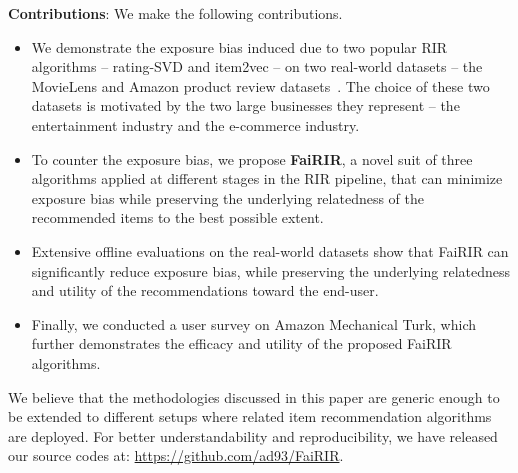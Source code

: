 \vspace{1mm}
\noindent
\textbf{Contributions}: We make the following contributions. 
\begin{itemize}[noitemsep,topsep=0pt,parsep=0pt,partopsep=0pt,leftmargin=*]
	\item We demonstrate the exposure bias induced due to two popular RIR algorithms -- rating-SVD and item2vec -- on two real-world datasets -- the MovieLens and Amazon product review datasets~\cite{harper2016movielens,he2016ups}. The choice of these two datasets is motivated by the two large businesses they represent -- the entertainment industry and the e-commerce industry.
	\item To counter the exposure bias, we propose {\bf FaiRIR}, a novel suit of three algorithms %
	applied at different stages in the RIR pipeline, that can minimize exposure bias
	while preserving the underlying relatedness of the recommended items to the best possible extent.
	\item Extensive offline evaluations on the real-world datasets show that %
	FaiRIR can significantly reduce exposure bias, while preserving the underlying relatedness and utility of the recommendations toward the end-user.
	\item Finally, we conducted %
	a user survey on Amazon Mechanical Turk, which 
	further demonstrates the efficacy and utility of the proposed FaiRIR algorithms. %
\end{itemize}


\noindent We believe that the methodologies discussed in this paper are generic enough to be extended to different setups where related item recommendation algorithms are deployed. For better understandability and reproducibility, we have released our source codes at: \url{https://github.com/ad93/FaiRIR}.
